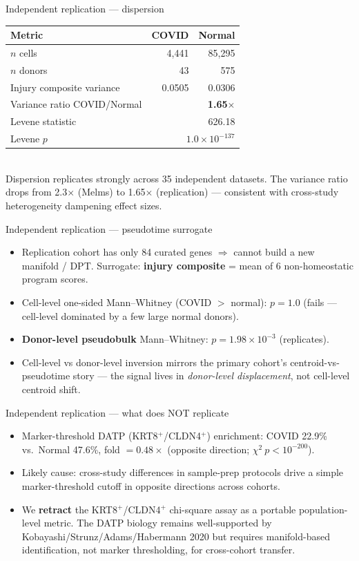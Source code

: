 \documentclass[aspectratio=169]{beamer}
\begin{document}
\begin{frame}{Independent replication --- dispersion}
\small
\begin{tabular}{lrr}
\toprule
Metric & COVID & Normal \\
\midrule
$n$ cells & 4{,}441 & 85{,}295 \\
$n$ donors & 43 & 575 \\
Injury composite variance & 0.0505 & 0.0306 \\
Variance ratio COVID/Normal & \multicolumn{2}{r}{\textbf{1.65$\times$}} \\
Levene statistic & \multicolumn{2}{r}{626.18} \\
Levene $p$ & \multicolumn{2}{r}{$1.0\times 10^{-137}$} \\
\bottomrule
\end{tabular}
\\[4pt]
\alert{Dispersion replicates strongly across 35 independent datasets.} The variance ratio
drops from 2.3$\times$ (Melms) to 1.65$\times$ (replication) --- consistent with cross-study
heterogeneity dampening effect sizes.
\end{frame}

\begin{frame}{Independent replication --- pseudotime surrogate}
\begin{itemize}
  \item Replication cohort has only 84 curated genes $\Rightarrow$ cannot build a new
        manifold / DPT. Surrogate: \textbf{injury composite} = mean of 6 non-homeostatic
        program scores.
  \item Cell-level one-sided Mann--Whitney (COVID $>$ normal): $p = 1.0$
        (fails --- cell-level dominated by a few large normal donors).
  \item \textbf{Donor-level pseudobulk} Mann--Whitney: $p = 1.98\times 10^{-3}$ \alert{(replicates)}.
  \item Cell-level vs donor-level inversion mirrors the primary cohort's centroid-vs-pseudotime
        story --- the signal lives in \emph{donor-level displacement}, not cell-level
        centroid shift.
\end{itemize}
\end{frame}

\begin{frame}{Independent replication --- what does NOT replicate}
\begin{itemize}
  \item Marker-threshold DATP (KRT8$^+$/CLDN4$^+$) enrichment: COVID 22.9\% vs.\
        Normal 47.6\%, fold $= 0.48\times$ (opposite direction; $\chi^2\ p < 10^{-200}$).
  \item Likely cause: cross-study differences in sample-prep protocols drive
        a simple marker-threshold cutoff in opposite directions across cohorts.
  \item We \textbf{retract} the KRT8$^+$/CLDN4$^+$ chi-square assay as a
        portable population-level metric. The DATP biology remains well-supported
        by Kobayashi/Strunz/Adams/Habermann 2020 but requires manifold-based
        identification, not marker thresholding, for cross-cohort transfer.
\end{itemize}
\end{frame}
\end{document}
